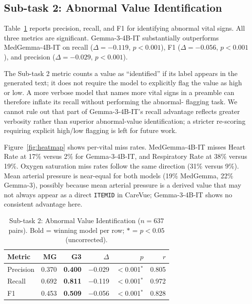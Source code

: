 \documentclass[sigconf,anonymous=false,review=false]{acmart}
\newcommand{\medgemma}{MedGemma-4B-IT\xspace}
\newcommand{\gemma}{Gemma-3-4B-IT\xspace}
\newcommand{\sig}{$p{<}0.001$}
\begin{document}
\subsection{Sub-task 2: Abnormal Value Identification}

Table~\ref{tab:abnormal} reports precision, recall, and F1 for identifying
abnormal vital signs. All three metrics are significant. \gemma
substantially outperforms \medgemma on recall ($\Delta = -0.119$, \sig),
F1 ($\Delta = -0.056$, \sig), and precision ($\Delta = -0.029$, \sig).

The Sub-task 2 metric counts a value as ``identified'' if its label appears
in the generated text; it does not require the model to explicitly flag the
value as high or low. A more verbose model that names more vital signs in a
preamble can therefore inflate its recall without performing the abnormal-
flagging task. We cannot rule out that part of \gemma's recall advantage
reflects greater verbosity rather than superior abnormal-value
identification; a stricter re-scoring requiring explicit
high/low flagging is left for future work.

Figure~\ref{fig:heatmap} shows per-vital miss rates. \medgemma misses
Heart Rate at 17\% versus 2\% for \gemma, and Respiratory Rate at 38\%
versus 19\%. Oxygen saturation miss rates follow the same direction (31\%
versus 9\%). Mean arterial pressure is near-equal for both models (19\%
MedGemma, 22\% Gemma-3), possibly because mean arterial pressure is a
derived value that may not always appear as a direct \texttt{ITEMID} in
CareVue; \gemma shows no consistent advantage here.

\begin{table}[t]
\caption{Sub-task 2: Abnormal Value Identification ($n = 637$ pairs).
Bold = winning model per row; $*$ = $p < 0.05$ (uncorrected).}
\label{tab:abnormal}
\small
\begin{tabular}{@{}lrrrrr@{}}
\toprule
\textbf{Metric} & \textbf{MG} & \textbf{G3} & \textbf{$\Delta$} &
  \textbf{$p$} & \textbf{$r$} \\
\midrule
Precision & 0.370 & \textbf{0.400} & $-$0.029 & $<$0.001$^*$ & 0.805 \\
Recall    & 0.692 & \textbf{0.811} & $-$0.119 & $<$0.001$^*$ & 0.972 \\
F1        & 0.453 & \textbf{0.509} & $-$0.056 & $<$0.001$^*$ & 0.828 \\
\bottomrule
\end{tabular}
\end{table}
\end{document}
